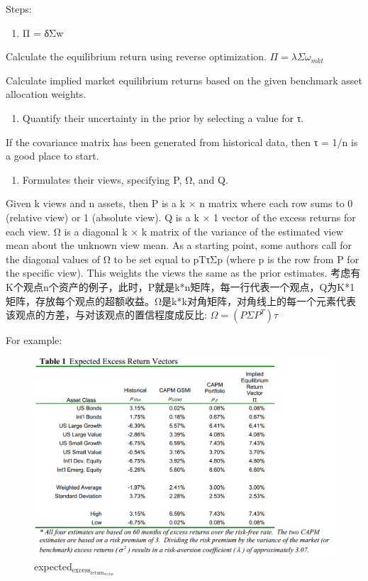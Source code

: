 \documentclass[presentation]{beamer}
\begin{document}
\begin{frame}[label={sec:orgheadline26}]{Steps:}
\begin{enumerate}
\item Π = δΣw
\end{enumerate}
Calculate the equilibrium return using reverse optimization.
\(\Pi=\lambda\Sigma\omega_{mkt}\)

Calculate implied market equilibrium returns based on the given benchmark asset allocation weights.
\begin{enumerate}
\item Quantify their uncertainty in the prior by selecting a value for τ.
\end{enumerate}
If the covariance matrix has been generated from historical data, then τ = 1/n is a good place to start.
\begin{enumerate}
\item Formulates their views, specifying P, Ω, and Q.
\end{enumerate}
Given k views and n assets, then P is a k × n matrix where each row sums to 0 (relative view) or 1 (absolute view).
Q is a k × 1 vector of the excess returns for each view.
Ω is a diagonal k × k matrix of the variance of the estimated view mean about the unknown view mean. As a starting point, some authors call for the diagonal values of Ω to be set equal to pTτΣp (where p is the row from P for the specific view). This weights the views the same as the prior estimates.
考虑有K个观点n个资产的例子，此时，P就是k*n矩阵，每一行代表一个观点，Q为K*1矩阵，存放每个观点的超额收益。Ω是k*k对角矩阵，对角线上的每一个元素代表该观点的方差，与对该观点的置信程度成反比:
\(\Omega=(P\Sigma P^T)\tau\)

For example:
\begin{figure}[htb]
\centering
\includegraphics[width=.9\linewidth]{./images/expected_excess_return_vector.png}
\caption{expected\(_{\text{excess}}_{\text{return}}_{\text{vector}}\)}
\end{figure}


\end{frame}
\end{document}
